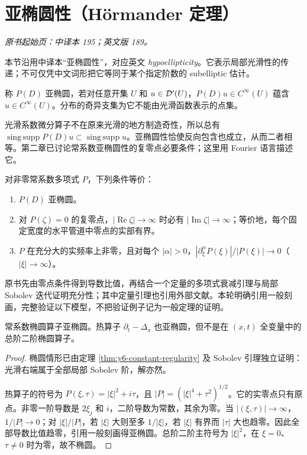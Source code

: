 \section{亚椭圆性（Hörmander 定理）}\label{sec:yosida-06-12}
\noindent\textit{原书起始页：中译本 195；英文版 189。}

本节沿用中译本“亚椭圆性”，对应英文 \textit{hypoellipticity}。它表示局部光滑性的传递；不可仅凭中文词形把它等同于某个指定阶数的 subelliptic 估计。

\begin{definition}[亚椭圆性与奇异支集]
称 $P(D)$ 亚椭圆，若对任意开集 $U$ 和 $u\in\mathcal{D}'(U)$，$P(D)u\in C^\infty(U)$ 蕴含 $u\in C^\infty(U)$。分布的奇异支集为它不能由光滑函数表示的点集。
\end{definition}

光滑系数微分算子不在原来光滑的地方制造奇性，所以总有 $\operatorname{sing\,supp}P(D)u\subset\operatorname{sing\,supp}u$。亚椭圆性恰使反向包含也成立，从而二者相等。第二章已讨论常系数亚椭圆性的复零点必要条件；这里用 Fourier 语言描述它。

\begin{theorem}\label{thm:y6-hypo-criterion}
对非零常系数多项式 $P$，下列条件等价：
\begin{enumerate}
 \item $P(D)$ 亚椭圆。
 \item 对 $P(\zeta)=0$ 的复零点，$|\operatorname{Re}\zeta|\to\infty$ 时必有 $|\operatorname{Im}\zeta|\to\infty$；等价地，每个固定宽度的水平管道中零点的实部有界。
 \item $P$ 在充分大的实频率上非零，且对每个 $|\alpha|>0$，$|\partial_\xi^\alpha P(\xi)|/|P(\xi)|\to0$（$|\xi|\to\infty$）。
\end{enumerate}
\end{theorem}

原书先由零点条件得到导数比值，再结合一个定量的多项式衰减引理与局部 Sobolev 迭代证明充分性；其中定量引理也引用外部文献。本轮明确引用一般刻画，完整验证以下模型，不把验证例子记为一般定理的证明。

\begin{proposition}[椭圆算子与热算子]
常系数椭圆算子亚椭圆。热算子 $\partial_t-\Delta_x$ 也亚椭圆，但不是在 $(x,t)$ 全变量中的总阶二阶椭圆算子。
\end{proposition}
\begin{proof}
椭圆情形已由定理 \ref{thm:y6-constant-regularity} 及 Sobolev 引理独立证明：光滑右端属于全部局部 Sobolev 阶，解亦然。

热算子的符号为 $P(\xi,\tau)=|\xi|^2+i\tau$，且
$|P|=(|\xi|^4+\tau^2)^{1/2}$。它的实零点只有原点。非零一阶导数是 $2\xi_j$ 和 $i$，二阶导数为常数，其余为零。当 $|(\xi,\tau)|\to\infty$，$1/|P|\to0$；对 $|\xi|/|P|$，若 $|\xi|$ 大则至多 $1/|\xi|$，若 $|\xi|$ 有界而 $|\tau|$ 大也趋零。因此全部导数比值趋零，引用一般刻画得亚椭圆。总阶二阶主符号为 $|\xi|^2$，在 $\xi=0$、$\tau\ne0$ 时为零，故不椭圆。
\end{proof}


